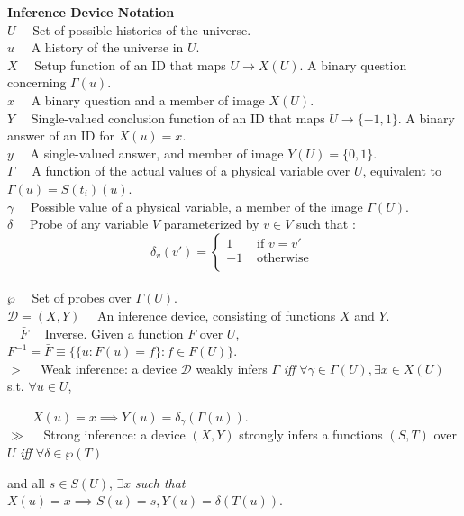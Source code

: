\documentclass[11pt]{article}
\begin{document}
\textbf{Inference Device Notation} \\
$ U \quad $ Set of possible histories of the universe. \\
$ u \quad $ A history of the universe in $ U $. \\ 
$ X \quad $ Setup function of an ID that maps $ U \rightarrow X(U) $. A binary question concerning $ \Gamma(u) $. \\
$ x \quad $ A binary question and a member of image $ X(U) $. \\ 
$ Y \quad $ Single-valued conclusion function of an ID that maps $ U \rightarrow \{-1, 1\} $. A binary answer of an ID for  $ X(u) = x $. \\ 
$ y \quad $ A single-valued answer, and member of image $ Y(U)  = \{0, 1\} $. \\ 
$ \Gamma \quad $ A function of the actual values of a physical variable over $U$, equivalent to $\Gamma(u) = S(t_i)(u)$.  \\
$ \gamma \quad $ Possible value of a physical variable, a member of the image $\Gamma(U)$. \\
$ \delta \quad $ Probe of any variable $V$ parameterized by $v \in V$ such that : 
	  \[ \delta_v (v') =
	  \begin{cases} 
       1 & \text{ if } v = v' \\
       -1 & \text{ otherwise } \\
      \end{cases}\] \\
$ \wp \quad $ Set of probes over $\Gamma(U)$. \\
$ \mathcal{D} = (X, Y) \quad $ An inference device, consisting of functions $ X $ and $ Y $. \\
$ \quad \bar{F} \quad $ Inverse. Given a function $ F $ over $ U $, $F ^ {-1} = \bar{F} \equiv \{\{u : F(u) = f \} : f \in F(U) \} $. \\
$ > \quad $ Weak inference: a device $\mathcal{D}$ weakly infers $\Gamma$ \textit{iff} $ \forall \gamma \in \Gamma(U), \exists x \in X(U) $ s.t. $ \forall u \in U $, 

$ \quad \quad X(u) = x \implies Y(u) = \delta_{\gamma}(\Gamma(u)) $.  \\
$ \gg \quad $ Strong inference: a device $ (X, Y) $ strongly infers a functions $ (S, T) $ over $ U $ \textit{ iff } $\forall \delta \in \wp(T) $ 

\quad \quad and all $ s \in S(U) $, $ \exists x $ \textit{ such that } $ X(u) = x \implies S(u) = s, Y(u) = \delta(T(u)) $. \\
\end{document}
